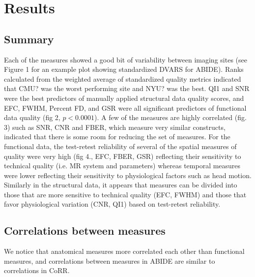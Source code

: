 \section{Results}
\label{sec:28}

\subsection{Summary}
Each of the measures showed a good bit of variability between imaging sites (see Figure 1 for an example plot showing standardized DVARS for ABIDE). Ranks calculated from the weighted average of standardized quality metrics indicated that CMU? was the worst performing site and NYU? was the best. QI1 and SNR were the best predictors of manually applied structural data quality scores, and EFC, FWHM, Percent FD, and GSR were all significant predictors of functional data quality (fig 2, $p < 0.0001$). A few of the measures are highly correlated (fig. 3) such as SNR, CNR and FBER, which measure very similar constructs, indicated that there is some room for reducing the set of measures. For the functional data, the test­-retest reliability of several of the spatial measures of quality were very high (fig 4., EFC, FBER, GSR) reflecting their sensitivity to technical quality (i.e. MR system and parameters) whereas temporal measures were lower reflecting their sensitivity to physiological factors such as head motion. Similarly in the structural data, it appears that measures can be divided into those that are more sensitive to technical quality (EFC, FWHM) and those that favor physiological variation (CNR, QI1) based on test­-retest reliability.

\subsection{Correlations between measures}
We notice that anatomical measures more correlated each other than functional measures, and correlations between measures in ABIDE are similar to correlations in CoRR.

